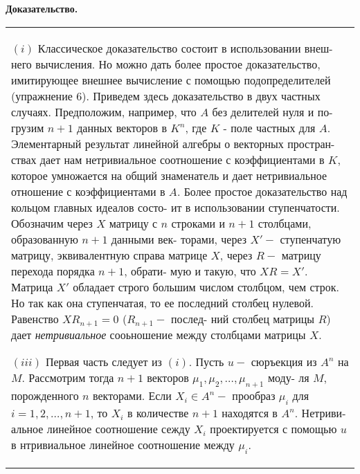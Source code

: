 	\noindent
	{\bf Доказательство.}\newline
	\begin{tabular}{|p{13cm}}
	$(i)$ Классическое доказательство состоит в использовании внеш-\linebreak
	него вычисления. Но можно дать более простое доказательство,\linebreak
	имитирующее внешнее вычисление с помощью подопределителей\linebreak
	(упражнение 6). Приведем здесь доказательство в двух частных\linebreak
	случаях. Предположим, например, что $A$ без делителей нуля и по-\linebreak
	грузим $n + 1$ данных векторов в $K^n$, где $K$ - поле частных для $A$.\linebreak
	Элементарный результат линейной алгебры о векторных простран-\linebreak
	ствах дает нам нетривиальное соотношение с коэффициентами в $K$,\linebreak
	которое умножается на общий знаменатель и дает нетривиальное\linebreak
	отношение с коэффициентами в $A$.\newline
	Более простое доказательство над кольцом главных идеалов состо-\linebreak
	ит в использовании ступенчатости. Обозначим через $X$ матрицу с\linebreak
	$n$ строками и $n + 1$ столбцами, образованную $n + 1$ данными век-\linebreak
	торами, через $X' -$ ступенчатую матрицу, эквивалентную справа\linebreak
	матрице $X$, через $R -$ матрицу перехода порядка $n + 1$, обрати-\linebreak
	мую и такую, что $XR = X'$. Матрица $X'$ обладает строго большим\linebreak
	числом столбцом, чем строк. Но так как она ступенчатая, то ее\linebreak
	последний столбец нулевой. Равенство $XR_{n + 1} = 0$ ($R_{n + 1} -$ послед-\linebreak
	ний столбец матрицы $R$) дает {\it нетривиальное} сооьношение между\linebreak
	столбцами матрицы $X$.
	
	$(iii)$ Первая часть следует из $(i)$. Пусть $u -$ сюръекция из $A^n$\linebreak
	на $M$. Рассмотрим тогда $n + 1$ векторов $\mu_1, \mu_2, \ldots, \mu_{n + 1}$ моду-\linebreak
	ля $M$, порожденного $n$ векторами. Если $X_i \in A^n - $ прообраз $\mu_i$ для\linebreak
	$i = 1, 2, \ldots, n + 1$, то $X_i$ в количестве $n + 1$ находятся в $A^n$. Нетриви-\linebreak
	альное линейное соотношение сежду $X_i$ проектируется с помощью\linebreak
	$u$ в нтривиальное линейное соотношение между $\mu_i$.\linebreak
	

\end{tabular}
